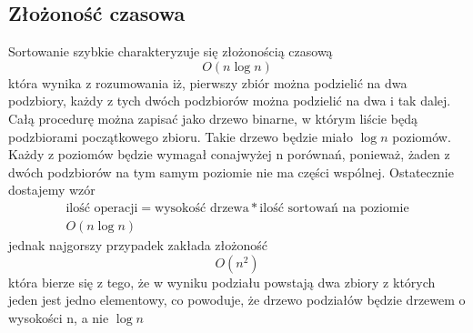 \documentclass[]{article}
\begin{document}
	\subsection{Złożoność czasowa}
		Sortowanie szybkie charakteryzuje się złożonością czasową
		\[
		O(n\log{n})
		\]
		która wynika z rozumowania iż, pierwszy zbiór można podzielić na dwa podzbiory, każdy z tych dwóch podzbiorów można podzielić na dwa i tak dalej. Całą procedurę można zapisać jako drzewo binarne, w którym liście będą podzbiorami początkowego zbioru. Takie drzewo będzie miało $ \log{n} $ poziomów. Każdy z poziomów będzie wymagał conajwyżej n porównań, ponieważ, żaden z dwóch podzbiorów na tym samym poziomie nie ma części wspólnej. Ostatecznie dostajemy wzór 
		\begin{gather*}
			\text{ilość operacji} = \text{wysokość drzewa} *  \text{ilość sortowań na poziomie} \\  
			O(n\log{n})
		\end{gather*}
		jednak najgorszy przypadek zakłada złożoność 
		\[
		O(n^2)
		\]
		która bierze się z tego, że w wyniku podziału powstają dwa zbiory z których jeden jest jedno elementowy, co powoduje, że drzewo podziałów będzie drzewem o wysokości n, a nie $ \log{n} $
\end{document}
